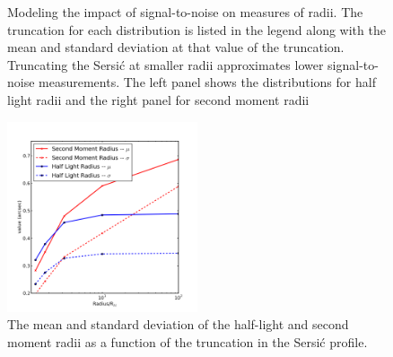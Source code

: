 \documentclass[11pt]{article}
\begin{document}
\begin{figure}[h]
\begin{subfigure}[b]{0.4\textwidth}
\end{subfigure}
\caption{Modeling the impact of signal-to-noise on measures of
  radii. The truncation for each distribution is listed in the legend
  along with the mean and standard deviation at that value of the
  truncation.  Truncating the Sersi{\'c} at smaller radii approximates
  lower signal-to-noise measurements.  The left panel shows the
  distributions for half light radii and the right panel for second
  moment radii}
\label{fig:size_hist}
\end{figure}


\begin{figure}[h]
\centering
\includegraphics[width=0.5\textwidth]{validation_figures/sec_mom_half_light_mean_sigma.png}
\caption{The mean and standard deviation of the half-light and second
 moment radii as a function of the truncation in the Sersi{\'c} profile.}
\label{fig:mom_hl_line}
\end{figure}
\end{document}
